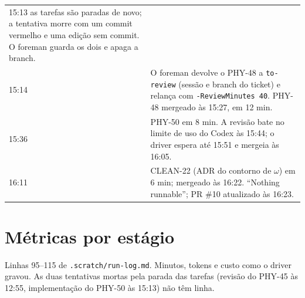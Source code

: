 \documentclass[11pt,a4paper]{article}
\begin{document}
\begin{tabularx}{\linewidth}{@{}lX@{}}
        15:13 as tarefas são paradas de novo; a tentativa morre com um commit
        vermelho e uma edição sem commit. O foreman guarda os dois e apaga a
        branch.\\
15:14 & O foreman devolve o PHY-48 a \texttt{to-review} (sessão e branch do
        ticket) e relança com \texttt{-ReviewMinutes 40}. PHY-48 mergeado
        às 15:27, em 12 min.\\
15:36 & PHY-50 em 8 min. A revisão bate no limite de uso do Codex às 15:44;
        o driver espera até 15:51 e mergeia às 16:05.\\
16:11 & CLEAN-22 (ADR do contorno de $\omega$) em 6 min; mergeado às 16:22.
        ``Nothing runnable''; PR \#10 atualizado às 16:23.\\
\bottomrule
\end{tabularx}

\section{Métricas por estágio}

Linhas 95--115 de \texttt{.scratch/run-log.md}. Minutos, tokens e custo como o
driver gravou. As duas tentativas mortas pela parada das tarefas (revisão do
PHY-45 às 12:55, implementação do PHY-50 às 15:13) não têm linha.
\end{document}
